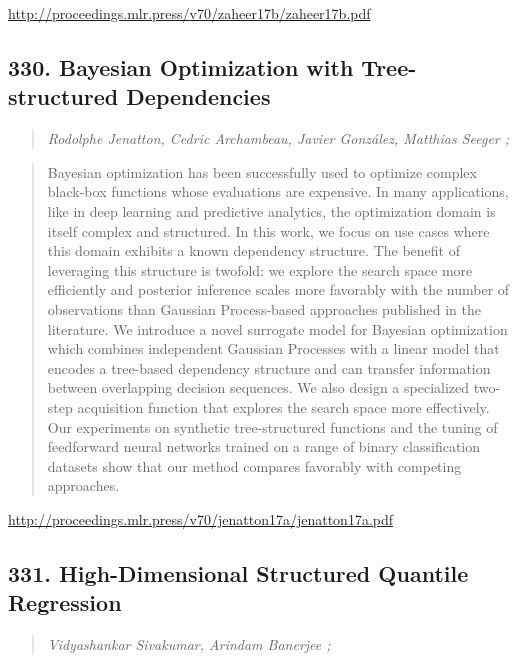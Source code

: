 \documentclass{article}
\begin{document}
\href{http://proceedings.mlr.press/v70/zaheer17b/zaheer17b.pdf}{http://proceedings.mlr.press/v70/zaheer17b/zaheer17b.pdf}

\subsection{330. Bayesian Optimization with Tree-structured Dependencies}

\begin{quote}
\footnotesize{\textit{Rodolphe Jenatton, Cedric Archambeau, Javier González, Matthias Seeger ;}}

\end{quote}

\begin{quote}
    Bayesian optimization has been successfully used to optimize complex black-box functions whose evaluations are expensive. In many applications, like in deep learning and predictive analytics, the optimization domain is itself complex and structured. In this work, we focus on use cases where this domain exhibits a known dependency structure. The benefit of leveraging this structure is twofold: we explore the search space more efficiently and posterior inference scales more favorably with the number of observations than Gaussian Process-based approaches published in the literature. We introduce a novel surrogate model for Bayesian optimization which combines independent Gaussian Processes with a linear model that encodes a tree-based dependency structure and can transfer information between overlapping decision sequences. We also design a specialized two-step acquisition function that explores the search space more effectively. Our experiments on synthetic tree-structured functions and the tuning of feedforward neural networks trained on a range of binary classification datasets show that our method compares favorably with competing approaches.  
\end{quote}

\href{http://proceedings.mlr.press/v70/jenatton17a/jenatton17a.pdf}{http://proceedings.mlr.press/v70/jenatton17a/jenatton17a.pdf}

\subsection{331. High-Dimensional Structured Quantile Regression}

\begin{quote}
\footnotesize{\textit{Vidyashankar Sivakumar, Arindam Banerjee ;}}

\end{quote}
\end{document}
